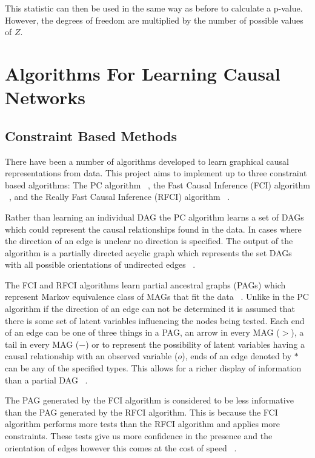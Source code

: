 \documentclass{UoYCSproject}
\begin{document}
This statistic can then be used in the same way as before to calculate a p-value. However, the degrees of freedom are multiplied by the number of possible values of $Z$. 

\section{Algorithms For Learning Causal Networks}
\subsection{Constraint Based Methods}
There have been a number of algorithms developed to learn graphical causal representations from data. This project aims to implement up to three constraint based algorithms: The PC algorithm ~\parencite{spirtes1991algorithm}, the Fast Causal Inference (FCI) algorithm ~\parencite{colombo2012learning}, and the Really Fast Causal Inference (RFCI) algorithm ~\parencite{colombo2012learning}.

Rather than learning an individual DAG the PC algorithm learns a set of DAGs which could represent the causal relationships found in the data. In cases where the direction of an edge is unclear no direction is specified. The output of the algorithm is a partially directed acyclic graph which represents the set DAGs with all possible orientations of undirected edges ~\parencite{spirtes1991algorithm}.

The FCI and RFCI algorithms learn partial ancestral graphs (PAGs) which represent Markov equivalence class of MAGs that fit the data  ~\parencite{colombo2012learning}. Unlike in the PC algorithm if the direction of an edge can not be determined it is assumed that there is some set of latent variables influencing the nodes being tested. Each end of an edge can be one of three things in a PAG, an arrow in every MAG ($>$), a tail in every MAG ($-$) or to represent the possibility of latent variables having a causal relationship with an observed variable ($o$), ends of an edge denoted by $*$ can be any of the specified types. This allows for a richer display of information than a partial DAG ~\parencite{colombo2012learning}.

The PAG generated by the FCI algorithm is considered to be less informative than the PAG generated by the RFCI algorithm. This is because the FCI algorithm performs more tests than the RFCI algorithm and applies more constraints. These tests give us more confidence in the presence and the orientation of edges however this comes at the cost of speed ~\parencite{colombo2012learning}.
\end{document}
